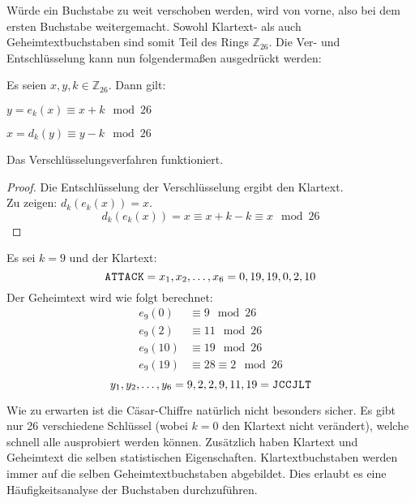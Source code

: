 \noindent
Würde ein Buchstabe zu weit verschoben werden, wird von vorne,
also bei dem ersten Buchstabe weitergemacht.
Sowohl Klartext- als auch Geheimtextbuchstaben sind somit Teil des Rings $\mathbb{Z}_{26}$.
Die Ver- und Entschlüsselung kann nun folgendermaßen ausgedrückt werden:

\begin{definition}
  Es seien $x,y,k \in \mathbb{Z}_{26}$. Dann gilt:
  \begin{description}[itemsep = 0pt]
    \item[Verschlüsselung:] $y = e_k(x) \equiv x + k \mod{26}$
    \item[Entschlüsselung:] $x = d_k(y) \equiv y - k \mod{26}$
  \end{description}
\end{definition}

\newpage
\noindent
Das Verschlüsselungsverfahren funktioniert.
\begin{proof}
  Die Entschlüsselung der Verschlüsselung ergibt den Klartext. \\
  Zu zeigen: $d_k(e_k(x)) = x$.
  \begin{equation*}
    d_k(e_k(x)) = x \equiv x + k - k \equiv x \mod{26}
  \end{equation*}
\end{proof}
\begin{example}
  Es sei $k = 9$ und der Klartext:
  \begin{equation*}
    \text{\texttt{A\kern 0.2mmT\kern 0.2mmT\kern 0.2mmA\kern 0.2mmC\kern 0.2mmK}}
    = x_1,x_2,\dots,x_6 = 0,19,19,0,2,10
  \end{equation*}
  Der Geheimtext wird wie folgt berechnet:
  \begin{align*}
    e_9(0)  & \equiv 9 \mod{26}           \\
    e_9(2)  & \equiv 11 \mod{26}          \\
    e_9(10) & \equiv 19 \mod{26}          \\
    e_9(19) & \equiv 28 \equiv 2 \mod{26}
  \end{align*}
  \begin{equation*}
    y_1,y_2,\dots,y_6 = 9,2,2,9,11,19 =
    \text{\texttt{J\kern 0.2mmC\kern 0.2mmC\kern 0.2mmJ\kern 0.2mmL\kern 0.2mmT}}
  \end{equation*}
\end{example}

\noindent
Wie zu erwarten ist die Cäsar-Chiffre natürlich nicht besonders sicher.
Es gibt nur 26 verschiedene Schlüssel (wobei $k = 0$ den Klartext nicht verändert),
welche schnell alle ausprobiert werden können. Zusätzlich
haben Klartext und Geheimtext die selben statistischen Eigenschaften.
Klartextbuchstaben werden immer auf die selben Geheimtextbuchstaben abgebildet. Dies
erlaubt es eine Häufigkeitsanalyse der Buchstaben durchzuführen.